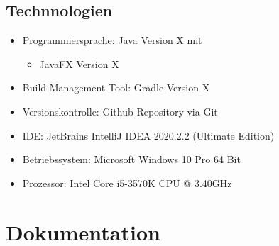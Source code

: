 \documentclass[11pt]{article}
\begin{document}
    \subsection{Technnologien}
    \begin{itemize}
        \item Programmiersprache: Java Version X mit
        \begin{itemize}
            \item JavaFX Version X
        \end{itemize}
        \item Build-Management-Tool: Gradle\cite{gradle} Version X
        \item Versionskontrolle: Github Repository\cite{github} via Git\cite{git}
        \item IDE: JetBrains IntelliJ IDEA\cite{idea} 2020.2.2 (Ultimate Edition)
        \item Betriebssystem: Microsoft Windows 10 Pro 64 Bit
        \item Prozessor: Intel Core i5-3570K CPU @ 3.40GHz
    \end{itemize}

    \newpage

    \section{Dokumentation}
\end{document}
